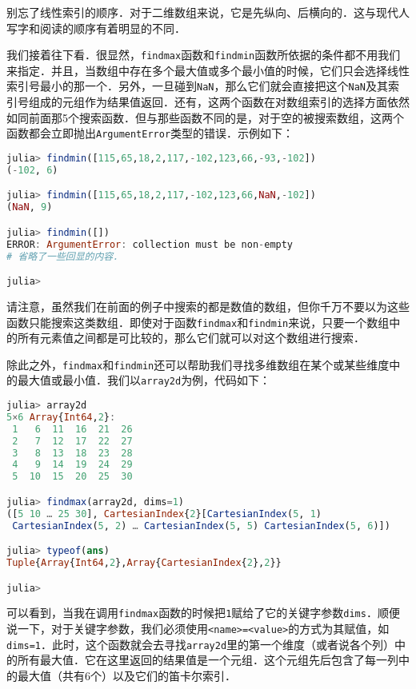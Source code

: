别忘了线性索引的顺序．对于二维数组来说，它是先纵向、后横向的．这与现代人写字和阅读的顺序有着明显的不同．

我们接着往下看．很显然，\verb|findmax|函数和\verb|findmin|函数所依据的条件都不用我们来指定．并且，当数组中存在多个最大值或多个最小值的时候，它们只会选择线性索引号最小的那一个．另外，一旦碰到\verb|NaN|，那么它们就会直接把这个\verb|NaN|及其索引号组成的元组作为结果值返回．还有，这两个函数在对数组索引的选择方面依然如同前面那5个搜索函数．但与那些函数不同的是，对于空的被搜索数组，这两个函数都会立即抛出\verb|ArgumentError|类型的错误．示例如下：

\begin{lstlisting}[language=julia]
julia> findmin([115,65,18,2,117,-102,123,66,-93,-102])
(-102, 6)

julia> findmin([115,65,18,2,117,-102,123,66,NaN,-102])
(NaN, 9)

julia> findmin([])
ERROR: ArgumentError: collection must be non-empty
# 省略了一些回显的内容．

julia> 
\end{lstlisting}

请注意，虽然我们在前面的例子中搜索的都是数值的数组，但你千万不要以为这些函数只能搜索这类数组．即使对于函数\verb|findmax|和\verb|findmin|来说，只要一个数组中的所有元素值之间都是可比较的，那么它们就可以对这个数组进行搜索．

除此之外，\verb|findmax|和\verb|findmin|还可以帮助我们寻找多维数组在某个或某些维度中的最大值或最小值．我们以\verb|array2d|为例，代码如下：

\begin{lstlisting}[language=julia]
julia> array2d
5×6 Array{Int64,2}:
 1   6  11  16  21  26
 2   7  12  17  22  27
 3   8  13  18  23  28
 4   9  14  19  24  29
 5  10  15  20  25  30

julia> findmax(array2d, dims=1)
([5 10 … 25 30], CartesianIndex{2}[CartesianIndex(5, 1)
 CartesianIndex(5, 2) … CartesianIndex(5, 5) CartesianIndex(5, 6)])

julia> typeof(ans)
Tuple{Array{Int64,2},Array{CartesianIndex{2},2}}

julia> 
\end{lstlisting}

可以看到，当我在调用\verb|findmax|函数的时候把\verb|1|赋给了它的关键字参数\verb|dims|．顺便说一下，对于关键字参数，我们必须使用\verb|<name>=<value>|的方式为其赋值，如\verb|dims=1|．此时，这个函数就会去寻找\verb|array2d|里的第一个维度（或者说各个列）中的所有最大值．它在这里返回的结果值是一个元组．这个元组先后包含了每一列中的最大值（共有6个）以及它们的笛卡尔索引．

